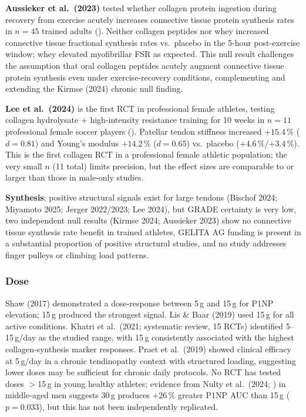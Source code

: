 \textbf{Aussieker et al.\ (2023)} tested whether collagen protein ingestion during recovery from exercise acutely increases connective tissue protein synthesis rates in $n{=}45$ trained adults (\cite{AHH+23}). Neither collagen peptides nor whey increased connective tissue fractional synthesis rates vs.\ placebo in the 5-hour post-exercise window; whey elevated myofibrillar FSR as expected. This null result challenges the assumption that oral collagen peptides acutely augment connective tissue protein synthesis even under exercise-recovery conditions, complementing and extending the Kirmse (2024) chronic null finding.

\textbf{Lee et al.\ (2024)} is the first RCT in professional female athletes, testing collagen hydrolysate $+$ high-intensity resistance training for 10 weeks in $n{=}11$ professional female soccer players (\cite{LRE24}). Patellar tendon stiffness increased $+15.4\,\%$ ($d{=}0.81$) and Young's modulus $+14.2\,\%$ ($d{=}0.65$) vs.\ placebo ($+4.6\,\%$/+3.4$\,\%$). This is the first collagen RCT in a professional female athletic population; the very small $n$ (11 total) limits precision, but the effect sizes are comparable to or larger than those in male-only studies.

\textbf{Synthesis}: positive structural signals exist for large tendons (Bischof 2024; Miyamoto 2025; Jerger 2022/2023; Lee 2024), but GRADE certainty is very low, two independent null results (Kirmse 2024; Aussieker 2023) show no connective tissue synthesis rate benefit in trained athletes, GELITA AG funding is present in a substantial proportion of positive structural studies, and no study addresses finger pulleys or climbing load patterns.

\subsubsection{Dose}

Shaw (2017) demonstrated a dose-response between 5\,g and 15\,g for P1NP elevation; 15\,g produced the strongest signal. Lis \& Baar (2019) used 15\,g for all active conditions. Khatri et al.\ (2021; systematic review, 15 RCTs) identified 5--15\,g/day as the studied range, with 15\,g consistently associated with the highest collagen-synthesis marker responses. Praet et al.\ (2019) showed clinical efficacy at 5\,g/day in a chronic tendinopathy context with structured loading, suggesting lower doses may be sufficient for chronic daily protocols. No RCT has tested doses $>$15\,g in young healthy athletes; evidence from Nulty et al.\ (2024; \cite{NTD+24}) in middle-aged men suggests 30\,g produces $+26\,\%$ greater P1NP AUC than 15\,g ($p{=}0.033$), but this has not been independently replicated.

